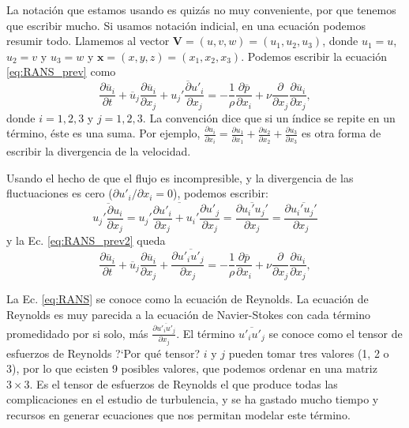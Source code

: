 La notación que estamos usando es quizás no muy conveniente, por que tenemos que escribir mucho.
Si usamos notación indicial, en una ecuación podemos resumir todo. 
Llamemos al vector $\mathbf{V} = (u,v,w) = (u_1,u_2,u_3)$, donde $u_1=u$, $u_2=v$ y $u_3=w$ y $\mathbf{x} = (x,y,z) = (x_1,x_2,x_3)$.
Podemos escribir la ecuación \eqref{eq:RANS_prev} como
%
\begin{equation}\label{eq:RANS_prev2}
\frac{\partial \overline{u}_i}{\partial t} + \overline{u}_j\frac{\partial \overline{u}_i}{\partial x_j} + \overline{u_j'\frac{\partial u'_i}{\partial x_j}} = -\frac{1}{\rho}\frac{\partial \overline{p}}{\partial x_i} + \nu \frac{\partial}{\partial x_j}\frac{\partial \overline{u}_i}{\partial x_j},
\end{equation}
%
donde $i=1,2,3$ y $j=1,2,3$. 
La convención dice que si un índice se repite en un término, éste es una suma.
Por ejemplo, $\frac{\partial u_i}{\partial x_i}=\frac{\partial u_1}{\partial x_1} + \frac{\partial u_2}{\partial x_2} + \frac{\partial u_3}{\partial x_3}$ es otra forma de escribir la divergencia de la velocidad.

Usando el hecho de que el flujo es incompresible, y la divergencia de las fluctuaciones es cero ($\partial u'_i/\partial x_i=0$), podemos escribir:
%
\begin{equation}
\overline{u_j'\frac{\partial u_i}{\partial x_j}} = \overline{u_j'\frac{\partial u'_i}{\partial x_j} + u_i'\frac{\partial u'_j}{\partial x_j}} = \overline{\frac{\partial u_i'u_j'}{\partial x_j}} = \frac{\partial \overline{u_i'u_j'}}{\partial x_j}
\end{equation}
%
y la Ec. \eqref{eq:RANS_prev2} queda
%
\begin{equation}\label{eq:RANS}
\frac{\partial \overline{u}_i}{\partial t} + \overline{u}_j\frac{\partial \overline{u}_i}{\partial x_j} + \frac{\partial \overline{u'_iu'_j}}{\partial x_j} = -\frac{1}{\rho}\frac{\partial \overline{p}}{\partial x_i} + \nu \frac{\partial}{\partial x_j}\frac{\partial \overline{u}_i}{\partial x_j},
\end{equation}

La Ec. \eqref{eq:RANS} se conoce como la ecuación de Reynolds.
La ecuación de Reynolds es muy parecida a la ecuación de Navier-Stokes con cada término promedidado por si solo, más $\frac{\partial \overline{u'_iu'_j}}{\partial x_j}$.
El término $\overline{u'_iu'_j}$ se conoce como el tensor de esfuerzos de Reynolds \mbox{?`}Por qué tensor? $i$ y $j$ pueden tomar tres valores (1, 2 o 3), por lo que ecisten 9 posibles valores, que podemos ordenar en una matriz $3\times 3$.
Es el tensor de esfuerzos de Reynolds el que produce todas las complicaciones en el estudio de turbulencia, y se ha gastado mucho tiempo y recursos en generar ecuaciones que nos permitan modelar este término.

